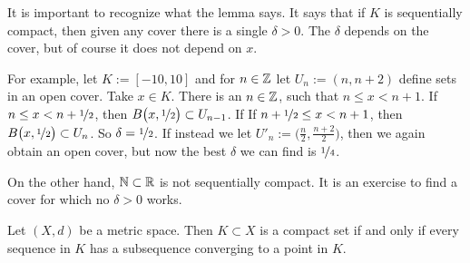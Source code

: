 It is important to recognize what the lemma says.  It says that
if $K$ is sequentially compact, then given any
cover there is a single $\delta > 0$.  The $\delta$ depends on the cover,
but of course it does not depend on $x$.

For example, let $K := [-10,10]$ and for $n \in {\mathbb{Z}}$ let $U_n :=
(n,n+2)$ define sets in an open cover.
Take $x \in K$. There is an $n \in {\mathbb{Z}}$, 
such that $n \leq x < n+1$.
If $n \leq x < n+\nicefrac{1}{2}$, then
$B\bigl(x,\nicefrac{1}{2}\bigr) \subset U_{n-1}$.  If
If $n+ \nicefrac{1}{2} \leq x < n+1$, then
$B\bigl(x,\nicefrac{1}{2}\bigr) \subset U_{n}$.  So $\delta =
\nicefrac{1}{2}$.  If instead we let $U'_n :=
\bigl(\frac{n}{2},\frac{n+2}{2} \bigr)$, then we again obtain an open
cover, but now the best $\delta$ we can find is $\nicefrac{1}{4}$.

On the other hand, ${\mathbb{N}} \subset {\mathbb{R}}$ is not sequentially compact.
It is an exercise to find a cover for which no $\delta > 0$ works.


\begin{thm} \label{thm:mscompactisseqcpt}
Let $(X,d)$ be a metric space.  Then $K \subset X$ is a compact set if
and only if every sequence in $K$ has a subsequence converging to
a point in $K$.
\end{thm}

